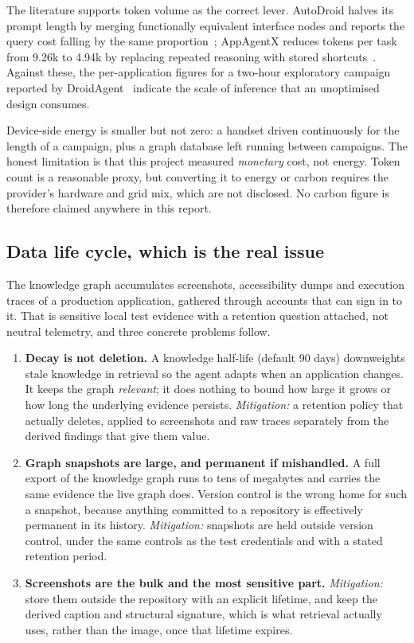 The literature supports token volume as the correct lever. AutoDroid halves its
prompt length by merging functionally equivalent interface nodes and reports
the query cost falling by the same proportion~\cite{autodroid}; AppAgentX
reduces tokens per task from 9.26k to 4.94k by replacing repeated reasoning
with stored shortcuts~\cite{appagentx}. Against these, the per-application
figures for a two-hour exploratory campaign reported by
DroidAgent~\cite{droidagent} indicate the scale of inference that an
unoptimised design consumes.

Device-side energy is smaller but not zero: a handset driven continuously for
the length of a campaign, plus a graph database left running between campaigns.
The honest limitation is that this project measured \emph{monetary} cost, not
energy. Token count is a reasonable proxy, but converting it to energy or
carbon requires the provider's hardware and grid mix, which are not disclosed.
No carbon figure is therefore claimed anywhere in this report.

\subsection*{Data life cycle, which is the real issue}

The knowledge graph accumulates screenshots, accessibility dumps and execution
traces of a production application, gathered through accounts that can sign in
to it. That is sensitive local test evidence with a retention question
attached, not neutral telemetry, and three concrete problems follow.

\begin{enumerate}[label=\textbf{E\arabic*.},leftmargin=3.0em]
  \item \textbf{Decay is not deletion.} A knowledge half-life (default 90 days)
    downweights stale knowledge in retrieval so the agent adapts when an
    application changes. It keeps the graph \emph{relevant}; it does nothing to
    bound how large it grows or how long the underlying evidence persists.
    \emph{Mitigation:} a retention policy that actually deletes, applied to
    screenshots and raw traces separately from the derived findings that give
    them value.
  \item \textbf{Graph snapshots are large, and permanent if mishandled.} A full export of the knowledge graph runs to tens of megabytes and carries the same evidence the live graph does. Version control is the wrong home for such a snapshot, because anything committed to a repository is effectively permanent in its history. \emph{Mitigation:} snapshots are held outside version control, under the same controls as the test credentials and with a stated retention period.
  \item \textbf{Screenshots are the bulk and the most sensitive part.}
    \emph{Mitigation:} store them outside the repository with an explicit
    lifetime, and keep the derived caption and structural signature, which is
    what retrieval actually uses, rather than the image, once that lifetime
    expires.
\end{enumerate}

